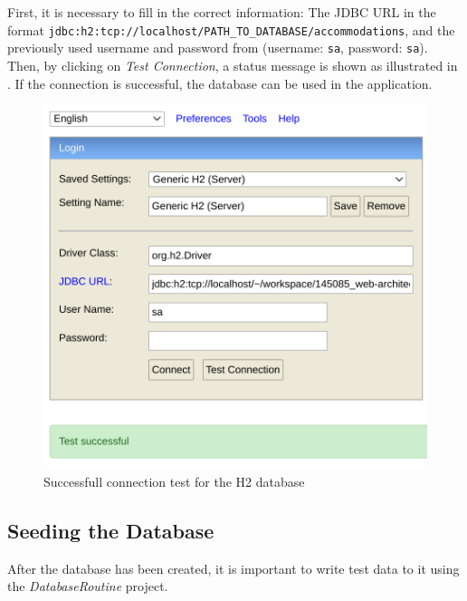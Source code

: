 First, it is necessary to fill in the correct information: The JDBC URL in the format \texttt{jdbc:h2:tcp://localhost/PATH\_TO\_DATABASE/accommodations}, and the previously used username and password from  (username: \texttt{sa}, password: \texttt{sa}).
Then, by clicking on \textit{Test Connection}, a status message is shown as illustrated in . If the connection is successful, the database can be used in the application.
\begin{figure}[h]
\centering
\includegraphics[scale=0.3]{images/03_depl/h2_test}
\caption{Successfull connection test for the H2 database}
\label{fig:03_depl_createdb_h2test}
\end{figure}

\newpage
\subsection{Seeding the Database}\label{sec:03_depl_seeddb}
After the database has been created, it is important to write test data to it using the \textit{DatabaseRoutine} project.


